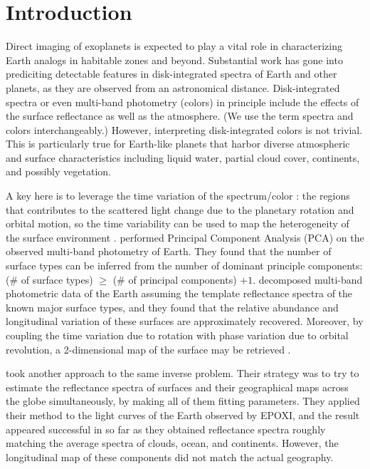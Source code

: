 \documentclass[iop,numberedappendix,apj]{emulateapj}
\begin{document}
  


\section{Introduction}
\label{sec:intro}

Direct imaging of exoplanets is expected to play a vital role in characterizing Earth analogs in habitable zones and beyond. 
Substantial work has gone into prediciting detectable features in disk-integrated spectra of Earth and other planets, as they are observed from an astronomical distance. 
Disk-integrated spectra or even multi-band photometry (colors) in principle include the effects of the surface reflectance as well as the atmosphere. (We use the term spectra and colors interchangeably.) 
However, interpreting disk-integrated colors is not trivial. 
This is particularly true for Earth-like planets that harbor diverse atmospheric and surface characteristics including liquid water, partial cloud cover, continents, and possibly vegetation. 

A key here is to leverage the time variation of the spectrum/color  \citep{Ford2001}: the regions that contributes to the scattered light change due to the planetary rotation and  orbital motion, so the time variability can be used to map the heterogeneity of the surface environment \citep[see][for recent review]{Cowan2017}.  
\citet{Cowan2009, Cowan2011} performed Principal Component Analysis (PCA) on the observed multi-band photometry of Earth. They found that the number of surface types can be inferred from the number of dominant principle components: (\# of surface types) $\ge $ (\# of principal components) $+ 1$.  
\citet{Fujii2010, Fujii2011} decomposed multi-band photometric data of the Earth assuming the template reflectance spectra of the known major surface types, and they found that the relative abundance and longitudinal variation of these surfaces are approximately recovered. 
Moreover, by coupling the time variation due to rotation with phase variation due to orbital revolution, a 2-dimensional map of the surface may be retrieved \citep{Kawahara2010, Kawahara2011, Fujii2012}. 

\citet{Cowan2013} took another approach to the same inverse problem. 
Their strategy was to try to estimate the reflectance spectra of surfaces and their geographical maps across the globe simultaneously, by making all of them fitting parameters. 
They applied their method to the light curves of the Earth observed by EPOXI, and the result appeared successful in so far as they obtained reflectance spectra roughly matching the average spectra of clouds, ocean, and continents. 
However, the longitudinal map of these components did not match the actual geography.  
\end{document}
